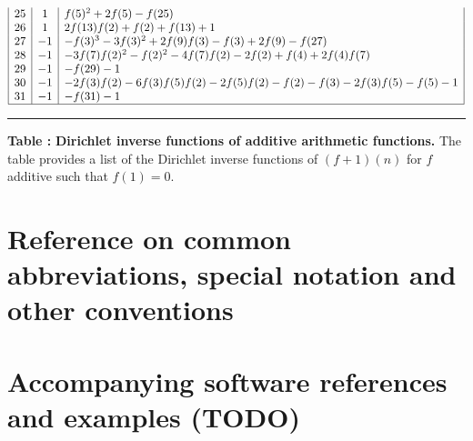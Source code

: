 \documentclass[11pt,reqno,a4letter]{article}
\numberwithin{figure}{section}
\numberwithin{table}{section}
\theoremstyle{plain}
\numberwithin{theorem}{section}
\theoremstyle{definition}
\begin{document}
\begin{table}[h!]
\begin{equation*}
{\begin{array}{|c|c|l|}
 25 & 1 & f(5)^2+2 f(5)-f(25) \\
 26 & 1 & 2 f(13) f(2)+f(2)+f(13)+1 \\
 27 & -1 & -f(3)^3-3 f(3)^2+2 f(9) f(3)-f(3)+2 f(9)-f(27) \\
 28 & -1 & -3 f(7) f(2)^2-f(2)^2-4 f(7) f(2)-2 f(2)+f(4)+2 f(4) f(7) \\
 29 & -1 & -f(29)-1 \\
 30 & -1 & -2 f(3) f(2)-6 f(3) f(5) f(2)-2 f(5) f(2)-f(2)-f(3)-2 f(3) f(5)-f(5)-1 \\
 31 & -1 & -f(31)-1 \\ 
   \hline 
\end{array}
}
\end{equation*} 

\bigskip\hrule\smallskip 

\caption*{\textbf{\rm \bf Table \thesubsection:} 
          \textbf{Dirichlet inverse functions of additive arithmetic functions.} 
          The table provides a list of the Dirichlet inverse functions of $(f+1)(n)$ for 
          $f$ additive such that $f(1) = 0$. } 

\end{table}


\newpage
\setcounter{section}{0}
\renewcommand{\thesection}{Appendix \Alph{section}}
\renewcommand{\thesubsection}{\Alph{section}.\arabic{subsection}}

\newpage
\section{Reference on common abbreviations, special notation and other conventions} 
\label{Appendix_Glossary_NotationConvs}

     \vskip -0.35in
     \printglossary[type={symbols},title={},style={glossstyleSymbol},nogroupskip=true]

\newpage
\section{Accompanying software references and examples (TODO)} 
\label{Appendix_SoftwarePackages} 
\end{document}

